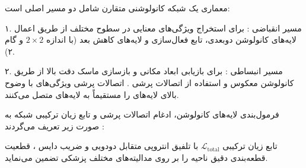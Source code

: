 


معماری  یک شبکه کانولوشنی متقارن شامل دو مسیر اصلی است:\par

۱. مسیر انقباضی : برای استخراج ویژگی‌های معنایی در سطوح مختلف از طریق اعمال لایه‌های کانولوشن دو‌بعدی، تابع فعال‌سازی  و لایه‌های کاهش بعد  (با اندازه $2 \times 2$ و گام ۲).\par

۲. مسیر انبساطی : برای بازیابی ابعاد مکانی و بازسازی ماسک دقت بالا از طریق کانولوشن معکوس  و استفاده از اتصالات پرشی . اتصالات پرشی ویژگی‌های با وضوح بالای لایه‌های  را مستقیماً به لایه‌های  متصل می‌کنند.\par



فرمول‌بندی لایه‌های کانولوشن، ادغام اتصالات پرشی و تابع زیان  ترکیبی شبکه  به صورت زیر تعریف می‌گردند :\par






تابع زیان ترکیبی $\mathcal{L}_{\text{total}}$ با تلفیق انتروپی متقابل دودویی  و ضریب دایس ، قطعیت قطعه‌بندی دقیق ناحیه  را بر روی مدالیته‌های مختلف پزشکی تضمین می‌نماید.\par

